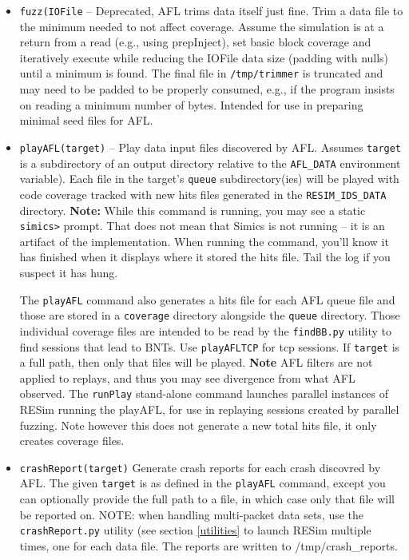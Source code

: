 \documentclass[titlepage]{article}
\begin{document}
\begin{itemize}
\item{\tt fuzz(IOFile} -- Deprecated, AFL trims data itself just fine.  Trim a data file to the minimum needed to not affect coverage. Assume the simulation is at 
a return from a read (e.g., using prepInject), set basic block coverage and iteratively execute while reducing the
IOFile data size (padding with nulls) until a minimum is found.  The final file in {\tt /tmp/trimmer} is truncated and may need to be padded to be properly consumed, e.g.,
if the program insists on reading a minimum number of bytes.  Intended for use in preparing minimal seed files for AFL.

\item{\tt playAFL(target)} -- Play data input files discovered by AFL.  Assumes {\tt target} is a subdirectory of an output directory 
relative to the {\tt AFL\_DATA} environment variable).  
Each file in the target's {\tt queue} subdirectory(ies) will be played with code coverage tracked with new hits files generated in the {\tt RESIM\_IDS\_DATA} directory.
\textbf{Note:} While this command is running, you may see a static {\tt simics>} prompt.  That does not mean that Simics is not running -- it is an artifact of the implementation.  When running the command, you'll know it has finished when it displays where it stored the hits file.
Tail the log if you suspect it has hung.

The {\tt playAFL} command also generates a hits file for each AFL queue file and those are stored in a {\tt coverage} directory alongside the {\tt queue} directory.
Those individual coverage files are intended to be read by the {\tt findBB.py} utility to find sessions that lead to BNTs.  Use {\tt playAFLTCP} for tcp sessions.
If {\tt target} is a full path, then only that files will be played.  \textbf{Note} AFL filters are not applied to replays, and thus you may see divergence from what AFL observed.
The {\tt runPlay} stand-alone command launches parallel instances of RESim running the playAFL, for use in replaying sessions created by parallel fuzzing.  Note however this 
does not generate a new total hits file, it only creates coverage files.

\item{\tt crashReport(target)} Generate crash reports for each crash discovred by AFL.  The given {\tt target} is as defined in the {\tt playAFL} command, except you can optionally provide the
full path to a file, in which case only that file will be reported on.  NOTE: when handling multi-packet data sets, use the {\tt crashReport.py} utility (see section \ref{utilities} to launch RESim multiple times,
one for each data file.  The reports are written to /tmp/crash\_reports.


\end{itemize}
\end{document}
